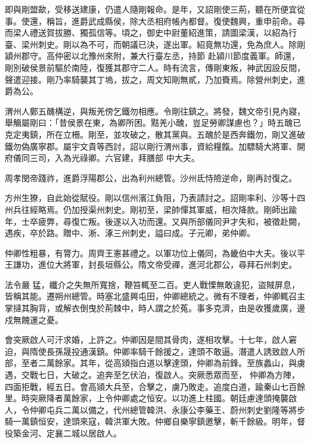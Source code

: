 \begin{pinyinscope}
 即與剛盟歃，受移送建康，仍遣人隨剛報命。是年，又詔剛使三荊，聽在所便宜從事。使還，稱旨，進爵武成縣侯，除大丞相府帳內都督。復使魏興，重申前命。尋而梁人禮送賀拔勝、獨孤信等。頃之，御史中尉董紹進策，請圖梁漢，以紹為行臺、梁州刺史。剛以為不可，而朝議已決，遂出軍。紹竟無功還，免為庶人。除剛潁州郡守。高仲密以北豫州來附，兼大行臺左丞，持節
 赴潁川節度義軍。師還，剛別破侯景前驅於南陸，復獲其郡守二人。時有流言，傳剛東叛，神武因設反間，聲遣迎接。剛乃率騎襲其丁塢，拔之，周文知剛無貳，乃加賚焉。除營州刺史，進爵為公。



 渭州人鄭五醜構逆，與叛羌傍乞鐵勿相應。令剛往鎮之。將發，魏文帝引見內寢，舉觴屬剛曰：「昔侯景在東，為卿所困。黠羌小醜，豈足勞卿謀慮也？」時五醜已克定夷鎮，所在立柵。剛至，並攻破之，散其黨與。五醜於是西奔鐵勿，剛又進破鐵勿偽廣寧郡。屬宇文貴等西討，詔以剛行渭州事，資給糧餼。加驃騎大將軍、開府儀同三司，入為光祿卿。六官建，拜膳部
 中大夫。



 周孝閔帝踐祚，進爵浮陽郡公，出為利州總管。沙州氐恃險逆命，剛再討復之。



 方州生獠，自此始從賦役。剛以信州濱江負阻，乃表請討之。詔剛率利、沙等十四州兵往經略焉。仍加授渠州刺史。剛初至，梁帥憚其軍威，相次降款。剛師出踰年，士卒疲弊，尋復亡叛。後遂以入功而還。又與所部儀同尹才失和，被徵赴闕，遇疾，卒於路。贈中、淅、涿三州刺史，謚曰成。子元卿，弟仲卿。



 仲卿性粗暴，有膂力。周齊王憲甚禮之。以軍功位上儀同，為畿伯中大夫。後以平王謙功，進位大將軍，封長垣縣公。隋文帝受禪，進河北郡公，尋拜石州刺史。



 法令嚴
 猛，纖介之失無所寬捨，鞭笞輒至二百。吏人戰慄無敢違犯，盜賊屏息，皆稱其能。遷朔州總管。時塞北盛興屯田，仲卿總統之。微有不理者，仲卿輒召主掌撻其胸背，或解衣倒曳於荊棘中，時人謂之於菟。事多克濟，由是收獲歲廣，邊戍無餽運之憂。



 會突厥啟人可汗求婚，上許之。仲卿因是間其骨肉，遂相攻擊。十七年，啟人窘迫，與隋使長孫晟投通漢鎮。仲卿率騎千餘援之，達頭不敢逼。潛遣人誘致啟人所部，至者二萬餘家。其年，從高熲指白道以擊達頭，仲卿為前鋒。至族蠡山，與虜遇，交戰七日，大破之。追奔至乞伏泊，復啟人。突厥悉眾而至，
 仲卿為方陣，四面拒戰，經五日。會高熲大兵至，合擊之，虜乃敗走。追度白道，踰秦山七百餘里。時突厥降者萬餘家，上令仲卿處之恒安。以功進上柱國。朝廷慮達頭掩襲啟人，令仲卿屯兵二萬以備之，代州總管韓洪、永康公李藥王、蔚州刺史劉隆等將步騎一萬鎮恒安，達頭來寇，韓洪軍大敗。仲鄉自樂寧鎮邀擊，斬千餘級。明年，督役築金河、定襄二城以居啟人。




\end{pinyinscope}
